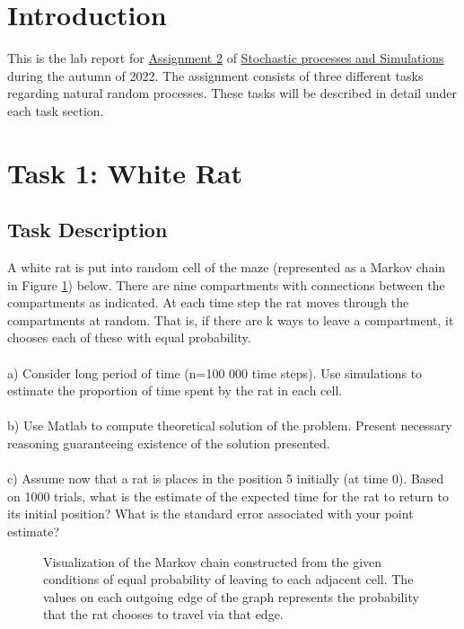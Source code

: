 \tableofcontents
\section*{Introduction}
This is the lab report for \href{https://www.canvas.umu.se/courses/6705/assignments/75609}{Assignment 2} of \href{https://www.umu.se/en/education/courses/stochastic-processes-and-simulation/}{Stochastic processes and Simulations} during the autumn of 2022. The assignment consists of three different tasks regarding natural random processes. These tasks will be described in detail under each task section.

\newpage
\section{Task 1: White Rat}
\label{sec:task1}

\subsection{Task Description}
\label{sec:desc1}
A white rat is put into random cell of the maze (represented as a Markov chain in Figure \ref{fig:ratchain}) below. There are nine compartments with connections between the compartments as indicated. At each time step the rat moves through the compartments at random. That is, if there are k ways to leave a compartment, it chooses each of these with equal probability. 
\\
\\a) Consider long period of time (n=100 000 time steps). Use simulations to estimate the proportion of
time spent by the rat in each cell.
\\
\\b) Use Matlab to compute theoretical solution of the problem. Present necessary reasoning guaranteeing existence of the solution presented.
\\
\\c) Assume now that a rat is places in the position 5 initially (at time 0). Based on 1000 trials, what is
the estimate of the expected time for the rat to return to its initial position? What is the standard error associated with your point estimate?

\begin{figure}[H]
    \centering
    \markovchain{}
    \caption{Visualization of the Markov chain constructed from the given conditions of equal probability of leaving to each adjacent cell. The values on each outgoing edge of the graph represents the probability that the rat chooses to travel via that edge.}
    \label{fig:ratchain}
\end{figure}




